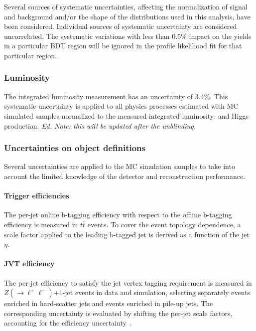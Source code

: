 \label{sec:vbf-uncertainties}

Several sources of systematic uncertainties,
affecting the normalization of signal and background and/or the shape of
the distributions used in this analysis, have been considered.  Individual sources of systematic 
uncertainty are considered uncorrelated. The systematic variations with less than $0.5\%$ impact 
on the yields in a particular BDT region will be ignored in the profile likelihood fit for 
that particular region. 

\subsubsection{Luminosity}
\label{sec:syst_lumi}

The integrated luminosity measurement has an uncertainty of 3.4\%. This systematic uncertainty
is applied to all physics processes estimated with MC simulated samples normalized 
to the measured integrated luminosity: \zjets{} and Higgs production. {\it Ed. Note: this will be updated after the unblinding.}

\subsubsection{Uncertainties on object definitions}
\label{sec:syst_objects}

Several uncertainties are applied to the MC simulation samples to take into account the limited knowledge of the detector and reconstruction performance.

\paragraph{Trigger efficiencies}

The per-jet online b-tagging efficiency with respect to the offline b-tagging efficiency is measured in $t\bar t$ events. 
To cover the event topology dependence, a scale factor applied to the leading b-tagged jet is derived as a function of the jet $\eta$. 

\paragraph{JVT efficiency}
The per-jet efficiency to satisfy the jet vertex tagging requirement
is measured in $Z(\to \ell^+\ell^-)$+1-jet events in data and simulation,
selecting separately events enriched in hard-scatter jets and events enriched in pile-up jets. 
The corresponding uncertainty is evaluated by shifting the per-jet scale factors,
accounting for the efficiency uncertainty~\cite{JVTwiki}.


